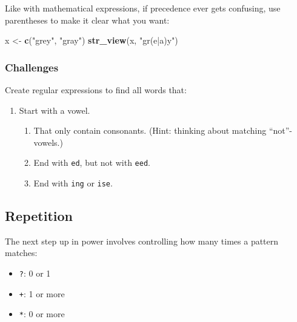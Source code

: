 \documentclass[]{book}
\newenvironment{Shaded}{\begin{snugshade}}{\end{snugshade}}
\newcommand{\KeywordTok}[1]{\textcolor[rgb]{0.13,0.29,0.53}{\textbf{#1}}}
\newcommand{\NormalTok}[1]{#1}
\newcommand{\StringTok}[1]{\textcolor[rgb]{0.31,0.60,0.02}{#1}}
\providecommand{\tightlist}{%
  \setlength{\itemsep}{0pt}\setlength{\parskip}{0pt}}
\begin{document}
Like with mathematical expressions, if precedence ever gets confusing, use parentheses to make it clear what you want:

\begin{Shaded}
\begin{Highlighting}[]
\NormalTok{x <-}\StringTok{ }\KeywordTok{c}\NormalTok{(}\StringTok{"grey"}\NormalTok{, }\StringTok{"gray"}\NormalTok{)}
\KeywordTok{str_view}\NormalTok{(x, }\StringTok{"gr(e|a)y"}\NormalTok{)}
\end{Highlighting}
\end{Shaded}

\hypertarget{htmlwidget-d11fc4360aa0230696d7}{}

\hypertarget{challenges-16}{%
\subsubsection*{Challenges}\label{challenges-16}}

Create regular expressions to find all words that:

\begin{enumerate}
\def\labelenumi{\arabic{enumi}.}
\item
  Start with a vowel.

  \begin{enumerate}
  \def\labelenumii{\arabic{enumii}.}
  \item
    That only contain consonants. (Hint: thinking about matching
    ``not''-vowels.)
  \item
    End with \texttt{ed}, but not with \texttt{eed}.
  \item
    End with \texttt{ing} or \texttt{ise}.
  \end{enumerate}
\end{enumerate}

\hypertarget{repetition}{%
\subsection{Repetition}\label{repetition}}

The next step up in power involves controlling how many times a pattern matches:

\begin{itemize}
\tightlist
\item
  \texttt{?}: 0 or 1
\item
  \texttt{+}: 1 or more
\item
  \texttt{*}: 0 or more
\end{itemize}
\end{document}
